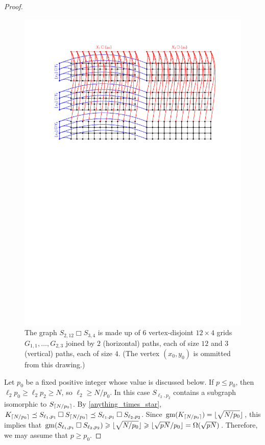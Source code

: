 \documentclass[lotsofwhite]{patmorin}
\newcommand{\boxprod}{\mathbin{\Box}}
\DeclarePairedDelimiter{\floor}{\lfloor}{\rfloor}
\DeclarePairedDelimiter{\ceil}{\lceil}{\rceil}
\renewcommand{\ge}{\geqslant}
\renewcommand{\le}{\leqslant}
\DeclareMathOperator{\gm}{gm}
\theoremstyle{plain}
\theoremstyle{definition}
\begin{document}
\begin{proof}
  \begin{figure}
    \begin{center}
      \includegraphics{t1xt2}
    \end{center}
    \caption{The graph $S_{2,12}\boxprod S_{3,4}$ is made up of $6$ vertex-disjoint $12\times 4$ grids $G_{1,1},\ldots,G_{2,3}$ joined by $2$ (horizontal) paths, each of size $12$ and $3$ (vertical) paths, each of size $4$.  (The vertex $(x_0,y_0)$ is ommitted from this drawing.)}
    \label{t1xt2}
  \end{figure}

  Let $p_0$ be a fixed positive integer whose value is discussed below. If $p \le p_0$, then $\ell_2 p_0 \ge \ell_2 p_2 \ge N$, so $\ell_2\ge N/p_0$.  In this case $S_{\ell_2,p_2}$ contains a subgraph isomorphic to $S_{\ceil{N/p_0}}$.  By \cref{anything_times_star}, $K_{\ceil{N/p_0}}\preceq S_{\ell_1,p_1}\boxprod S_{\ceil{N/p_0}} \preceq S_{\ell_1,p_1}\boxprod S_{\ell_2,p_2}$.  Since $\gm(K_{\ceil{N/p_0}}) = \floor{\sqrt{N/p_0}}$, this implies that $\gm(S_{\ell_1,p_1}\boxprod S_{\ell_2,p_2}) \ge \floor{\sqrt{N/p_0}}\ge \floor{\sqrt{pN}/p_0}=\Omega(\sqrt{pN})$.  Therefore, we may assume that $p\ge p_0$.


\end{proof}
\end{document}
